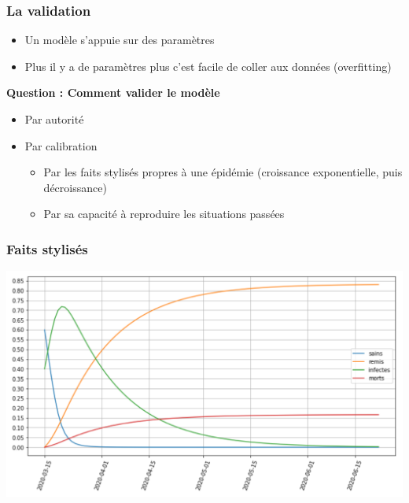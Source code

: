 \documentclass[a4paper]{cours-bdd}
\begin{document}
\begin{frame}[fragile]
  \frametitle{La validation}
  \begin{itemize}
  \item Un modèle s'appuie sur des paramètres
  \item Plus il y a de paramètres plus c'est facile de coller aux données (overfitting)
  \end{itemize}

  \bigskip
  
  \textbf{Question : Comment valider le modèle}

  \begin{itemize}
  \item Par autorité
    
  \item Par calibration
    \begin{itemize}
    \item Par les faits stylisés propres à une épidémie 
      (croissance exponentielle, puis décroissance)
    \item Par sa capacité à reproduire les situations passées %
  \end{itemize}

  \end{itemize}
\end{frame}



\begin{frame}[fragile]
  \frametitle{Faits stylisés}
  
  \begin{center}
            \includegraphics[width=1.0\linewidth]{fig3_sirgm.png} \\
  \end{center}

  
\end{frame}
\end{document}

